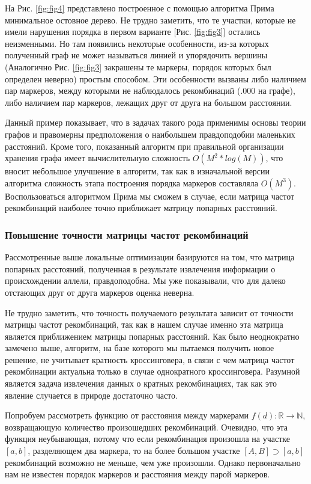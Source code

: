 \documentclass{matmex-diploma-custom}
\begin{document}
На Рис. \ref{fig:fig4} представлено построенное с помощью алгоритма
Прима минимальное остовное дерево. Не трудно заметить, что те участки,
которые не имели нарушения порядка в первом варианте
[Рис. \ref{fig:fig3}] остались неизменными. Но там появились некоторые
особенности, из-за которых полученный граф не может называться линией
и упорядочить вершины (Аналогично Рис. \ref{fig:fig3} закрашены те
маркеры, порядок которых был определен неверно) простым способом. Эти
особенности вызваны либо наличием пар маркеров, между которыми не
наблюдалось рекомбинаций (.000 на графе), либо наличием пар маркеров,
лежащих друг от друга на большом расстоянии.

Данный пример показывает, что в задачах такого рода применимы основы
теории графов и правомерны предположения о наибольшем правдоподобии
маленьких расстояний. Кроме того, показанный алгоритм при правильной
организации хранения графа имеет вычислительную сложность
$O(M^2*log(M))$, что вносит небольшое улучшение в алгоритм, так как в
изначальной версии алгоритма сложность этапа построения порядка
маркеров составляла $O(M^3)$. Воспользоваться алгоритмом Прима мы
сможем в случае, если матрица частот рекомбинаций наиболее точно
приближает матрицу попарных расстояний.

\subsubsection{Повышение точности матрицы частот рекомбинаций}

Рассмотренные выше локальные оптимизации базируются на том, что
матрица попарных расстояний, полученная в результате извлечения
информации о происхождении аллели, правдоподобна. Мы уже показывали,
что для далеко отстающих друг от друга маркеров оценка неверна.

Не трудно заметить, что точность получаемого результата зависит от
точности матрицы частот рекомбинаций, так как в нашем случае именно
эта матрица является приближением матрицы попарных расстояний.  Как
было неоднократно замечено выше, алгоритм, на базе которого мы
пытаемся получить новое решение, не учитывает кратность кроссинговера,
в связи с чем матрица частот рекомбинации актуальна только в случае
однократного кроссинговера. Разумной является задача извлечения данных
о кратных рекомбинациях, так как это явление случается в природе
достаточно часто.

Попробуем рассмотреть функцию от расстояния между маркерами
$f(d):\mathbb{R} \to \mathbb{N}$, возвращающую количество произошедших
рекомбинаций. Очевидно, что эта функция неубывающая, потому что если
рекомбинация произошла на участке $[a, b]$, разделяющем два маркера,
то на более большом участке $[A, B] \supset [a, b]$ рекомбинаций
возможно не меньше, чем уже произошли. Однако первоначально нам не
известен порядок маркеров и расстояния между парой маркеров.
\end{document}

